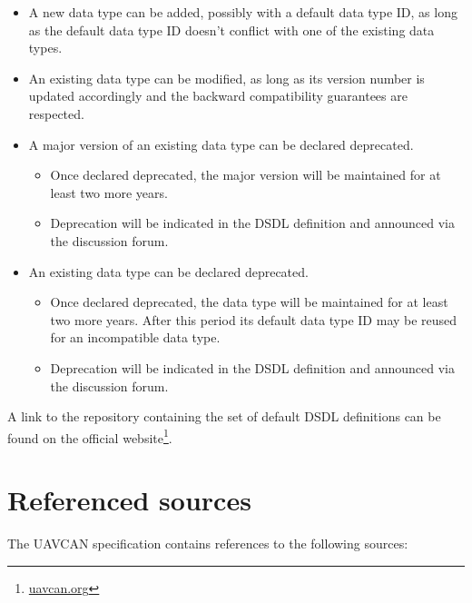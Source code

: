 \begin{itemize}
    \item A new data type can be added, possibly with a default data type ID,
    as long as the default data type ID doesn't conflict with one of the existing data types.

    \item An existing data type can be modified, as long as its version number is updated accordingly
    and the backward compatibility guarantees are respected.

    \item A major version of an existing data type can be declared deprecated.
    \begin{itemize}
        \item Once declared deprecated, the major version will be maintained for at least two more years.
        \item Deprecation will be indicated in the DSDL definition and announced via the discussion forum.
    \end{itemize}

    \item An existing data type can be declared deprecated.
    \begin{itemize}
        \item Once declared deprecated, the data type will be maintained for at least two more years.
        After this period its default data type ID may be reused for an incompatible data type.
        \item Deprecation will be indicated in the DSDL definition and announced via the discussion forum.
    \end{itemize}
\end{itemize}

A link to the repository containing the set of default DSDL definitions can be found on the official
website\footnote{\href{http://uavcan.org}{uavcan.org}}.

\section{Referenced sources}

The UAVCAN specification contains references to the following sources:

